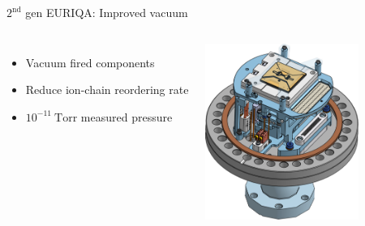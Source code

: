 \documentclass{beamer}
\begin{document}
%


\begin{frame}{$2^{\text{nd}}$ gen EURIQA: Improved vacuum}
  \begin{center}
    \begin{columns}
      \column{6.3cm}
      \begin{itemize}
      \item Vacuum fired components
      \item<2-> Reduce ion-chain reordering rate
      \item<3-> $10^{-11}\ \mathrm{Torr}$ measured pressure
      \end{itemize}
      \column{5.1cm}
      \includegraphics[width=5cm]{imgs/Vacuum_stack.png}
    \end{columns}
  \end{center}
\end{frame}
\end{document}
